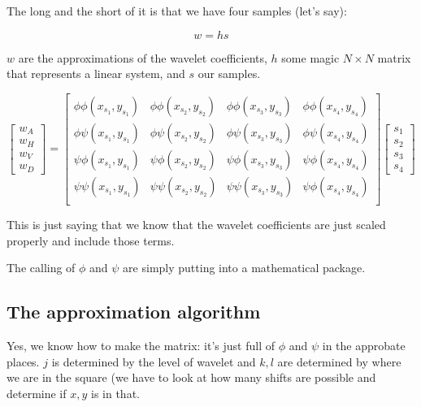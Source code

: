 \documentclass[leqno]{article}
\begin{document}
            The long and the short of it is that we have four samples (let's say):

            $$ w = h s $$

            $w$ are the approximations of the wavelet coefficients, $h$ some magic $N \times N$ matrix that represents a linear system, and $s$ our samples.

            \begin{equation}
                \begin{bmatrix}
                   w_A \\ w_H \\ w_V \\ w_D 
                \end{bmatrix}
                =
                \begin{bmatrix}
                    \phi\phi(x_{s_1},y_{s_1})& \phi\phi(x_{s_2},y_{s_2})&\phi\phi(x_{s_3},y_{s_3}) &\phi\phi(x_{s_4},y_{s_4})\\
                    \phi\psi(x_{s_1},y_{s_1})& \phi\psi(x_{s_2},y_{s_2})& \phi\psi(x_{s_3},y_{s_3})& \phi\psi(x_{s_4},y_{s_4})\\ 
                    \psi\phi(x_{s_1},y_{s_1})& \psi\phi(x_{s_2},y_{s_2})& \psi\phi(x_{s_3},y_{s_3})& \psi\phi(x_{s_4},y_{s_4})\\ 
                    \psi\psi(x_{s_1},y_{s_1})& \psi\psi(x_{s_2},y_{s_2})& \psi\psi(x_{s_3},y_{s_3})& \psi\phi(x_{s_4},y_{s_4})\\ 
                \end{bmatrix}
                \begin{bmatrix}
                   s_1 \\ s_2 \\ s_3 \\ s_4 
                \end{bmatrix}
                \label{eq:theeq}
            \end{equation}

            This is just saying that we know that the wavelet coefficients are just scaled properly and include those terms.

            The calling of $\phi$ and $\psi$ are simply putting  into a mathematical package.

        \subsection{The approximation algorithm}
        Yes, we know how to make the matrix: it's just full of $\phi$ and $\psi$ in the approbate places. $j$ is determined by the level of wavelet and $k,l$ are determined by where we are in the square (we have to look at how many shifts are possible and determine if $x,y$ is in that. 
\end{document}
